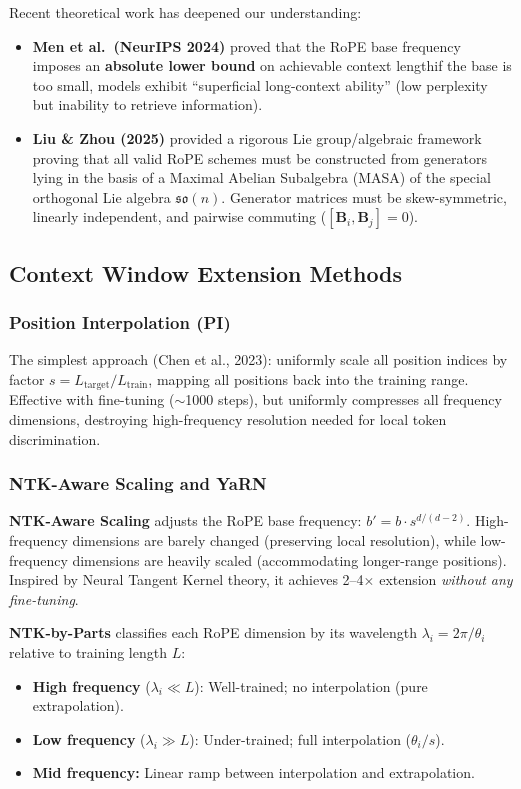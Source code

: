 \documentclass[11pt,a4paper]{article}
\begin{document}
Recent theoretical work has deepened our understanding:
\begin{itemize}[leftmargin=*]
    \item \textbf{Men et al.\ (NeurIPS 2024)} proved that the RoPE base frequency imposes an \textbf{absolute lower bound} on achievable context length\textemdash if the base is too small, models exhibit ``superficial long-context ability'' (low perplexity but inability to retrieve information).
    \item \textbf{Liu \& Zhou (2025)} provided a rigorous Lie group/algebraic framework proving that all valid RoPE schemes must be constructed from generators lying in the basis of a Maximal Abelian Subalgebra (MASA) of the special orthogonal Lie algebra $\mathfrak{so}(n)$. Generator matrices must be skew-symmetric, linearly independent, and pairwise commuting ($[\mathbf{B}_i, \mathbf{B}_j] = 0$).
\end{itemize}

\subsection{Context Window Extension Methods}

\subsubsection{Position Interpolation (PI)}

The simplest approach (Chen et al., 2023): uniformly scale all position indices by factor $s = L_{\text{target}} / L_{\text{train}}$, mapping all positions back into the training range. Effective with fine-tuning ($\sim$1000 steps), but uniformly compresses all frequency dimensions, destroying high-frequency resolution needed for local token discrimination.

\subsubsection{NTK-Aware Scaling and YaRN}

\textbf{NTK-Aware Scaling} adjusts the RoPE base frequency: $b' = b \cdot s^{d/(d-2)}$. High-frequency dimensions are barely changed (preserving local resolution), while low-frequency dimensions are heavily scaled (accommodating longer-range positions). Inspired by Neural Tangent Kernel theory, it achieves 2--4$\times$ extension \textit{without any fine-tuning}.

\textbf{NTK-by-Parts} classifies each RoPE dimension by its wavelength $\lambda_i = 2\pi/\theta_i$ relative to training length $L$:
\begin{itemize}[leftmargin=*]
    \item \textbf{High frequency} ($\lambda_i \ll L$): Well-trained; no interpolation (pure extrapolation).
    \item \textbf{Low frequency} ($\lambda_i \gg L$): Under-trained; full interpolation ($\theta_i / s$).
    \item \textbf{Mid frequency:} Linear ramp between interpolation and extrapolation.
\end{itemize}
\end{document}
